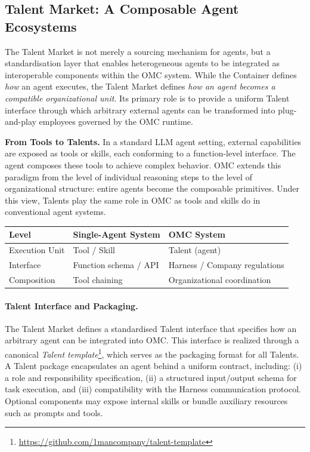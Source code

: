 \subsection{Talent Market: A Composable Agent Ecosystems}
\label{sec:talent-market}

The Talent Market is not merely a sourcing mechanism for agents, but a standardisation layer that enables heterogeneous agents to be integrated as interoperable components within the OMC system. While the Container defines \emph{how} an agent executes, the Talent Market defines \emph{how an agent becomes a compatible organizational unit}. Its primary role is to provide a uniform Talent interface through which arbitrary external agents can be transformed into plug-and-play employees governed by the OMC runtime.

\textbf{From Tools to Talents.}
In a standard LLM agent setting, external capabilities are exposed as tools or skills, each conforming to a function-level interface. The agent composes these tools to achieve complex behavior. OMC extends this paradigm from the level of individual reasoning steps to the level of organizational structure: entire agents become the composable primitives. Under this view, Talents play the same role in OMC as tools and skills do in conventional agent systems.

\begin{center}
\begin{tabular}{l|l|l}
\toprule
\textbf{Level} & \textbf{Single-Agent System} & \textbf{OMC System} \\
\midrule
Execution Unit & Tool / Skill & Talent (agent) \\
Interface & Function schema / API & Harness / Company regulations \\
Composition & Tool chaining & Organizational coordination \\
\bottomrule
\end{tabular}
\end{center}


\paragraph{Talent Interface and Packaging.}
The Talent Market defines a standardised Talent interface that specifies how an arbitrary agent can be integrated into OMC. This interface is realized through a canonical \emph{Talent template}\footnote{\url{https://github.com/1mancompany/talent-template}}, which serves as the packaging format for all Talents. A Talent package encapsulates an agent behind a uniform contract, including: (i) a role and responsibility specification, (ii) a structured input/output schema for task execution, and (iii) compatibility with the Harness communication protocol. Optional components may expose internal skills or bundle auxiliary resources such as prompts and tools.

